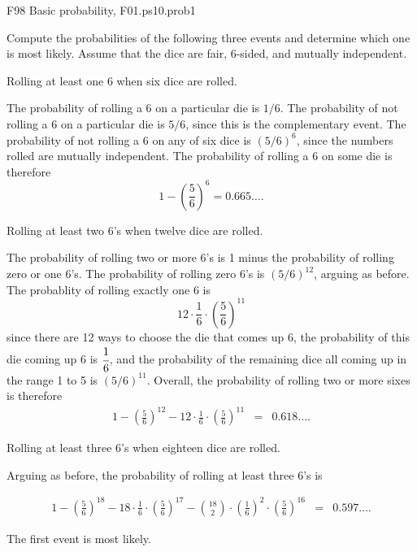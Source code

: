 \documentclass[handout]{mcs}
\begin{document}
\begin{problem}
\begin{staffnotes}
F98 Basic probability, F01.ps10.prob1
\end{staffnotes}

Compute the probabilities of the following three events and determine
which one is most likely.  Assume that the dice are fair, 6-sided, and
mutually independent.

\begin{problemparts}
\problempart Rolling at least one 6 when six dice are rolled.

\begin{solution}
The probability of rolling a 6 on a particular die is $1/6$.  The
probability of not rolling a 6 on a particular die is $5/6$, since
this is the complementary event.  The probability of not rolling a 6
on any of six dice is $(5/6)^6$, since the numbers rolled are mutually
independent.  The probability of rolling a 6 on some die is therefore
\[
1 - (\frac{5}{6})^6 = 0.665\ldots.
\]
\end{solution}

\problempart Rolling at least two 6's when twelve dice are rolled.

\begin{solution}
The probability of rolling two or more 6's is 1 minus the probability
of rolling zero or one 6's.  The probability of rolling zero 6's is
$(5/6)^{12}$, arguing as before.  The probablity of rolling exactly
one 6 is
\[
12 \cdot \frac{1}{6} \cdot \left(\frac{5}{6}\right)^{11}
\]
since there are 12 ways to choose the die that comes up 6, the
probability of this die coming up 6 is $\cfrac{1}{6}$, and the
probability of the remaining dice all coming up in the range 1 to 5 is
$(5/6)^{11}$.  Overall, the probability of rolling two or more sixes
is therefore
\begin{eqnarray*}
1 - \left(\frac{5}{6}\right)^{12} -
        12 \cdot \frac{1}{6} \cdot \left(\frac{5}{6}\right)^{11}
                & = &   0.618\ldots.
\end{eqnarray*}

\end{solution}

\problempart Rolling at least three 6's when eighteen dice are rolled.

\begin{solution}
Arguing as before, the probability of rolling at least three 6's is

\begin{eqnarray*}
1       - \left(\frac{5}{6}\right)^{18}
        - 18 \cdot \frac{1}{6} \cdot \left(\frac{5}{6}\right)^{17}
        - \binom{18}{2} \cdot \left(\frac{1}{6}\right)^2 \cdot
                \left(\frac{5}{6}\right)^{16}
        & = &   0.597\ldots.
\end{eqnarray*}
\end{solution}

\end{problemparts}

\begin{solution}
The first event is most likely.
\end{solution}
\end{problem}
\end{document}
